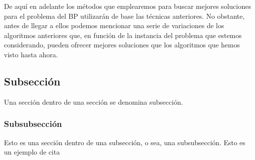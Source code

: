 \documentclass[a4paper, 12pt, oneside]{book}
\begin{document}
	De aqu\'i en adelante los m\'etodos que emplearemos para buscar mejores soluciones para el problema del BP utilizar\'an de base las t\'ecnicas anteriores. No obstante, antes de llegar a ellos podemos mencionar una serie de variaciones de los algoritmos anteriores que, en funci\'on de la instancia del problema que estemos considerando, pueden ofrecer mejores soluciones que los algoritmos que hemos visto hasta ahora.
	\\
	
	
	
	
	
	
	
	
	
	\subsection{Subsecci\'{o}n}
	Una secci\'{o}n dentro de una secci\'{o}n se denomina subsecci\'{o}n.
	\subsubsection{Subsubsecci\'{o}n}
	Esto es una secci\'{o}n dentro de una subsecci\'{o}n, o sea, una subsubsecci\'{o}n.
	Esto es un ejemplo de cita \cite{Zfinitegrading}
	
	
	
	
	
	
\end{document}
